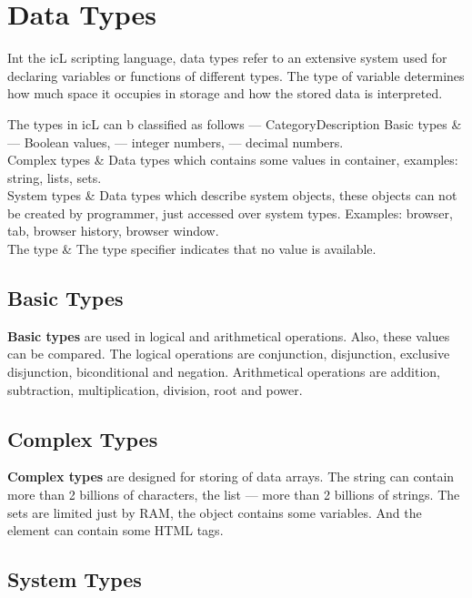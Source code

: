 \section{Data Types}

Int the icL scripting language, data types refer to an extensive system used for declaring variables or functions of different types. The type of variable determines how much space it occupies in storage and how the stored data is interpreted.

The types in icL can b classified as follows —
\stabletwo{3.5cm}{13.6cm}
{}{}{Category}{Description}
{
	Basic types      &  \bool{} — Boolean values, \integer{} — integer numbers, \double{} — decimal numbers. \\ \hline
	Complex types    & Data types which contains some values in container, examples: string, lists, sets. \\ \hline
	System types     & Data types which describe system objects, these objects can not be created by programmer, just accessed over system types. Examples: browser, tab, browser history, browser window. \\ \hline
	The \void{} type & The type specifier \void{} indicates that no value is available.
}

\subsection{Basic Types}

{\bf Basic types} are used in logical and arithmetical operations. Also, these values can be compared. The logical operations are conjunction, disjunction, exclusive disjunction, biconditional and negation. Arithmetical operations are addition, subtraction, multiplication, division, root and power.

\subsection{Complex Types}

{\bf Complex types} are designed for storing of data arrays. The string can contain more than 2 billions of characters, the list — more than 2 billions of strings. The sets are limited just by RAM, the object contains some variables. And the element can contain some HTML tags.

\subsection{System Types}


